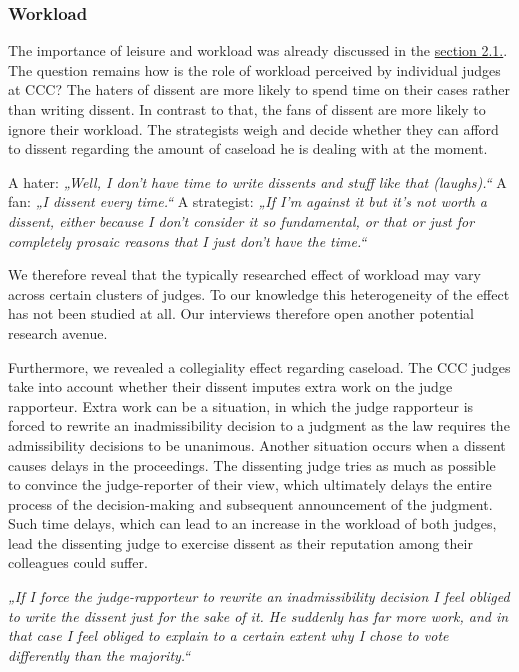 \documentclass[
  11pt,
]{article}
\begin{document}
\subsubsection{Workload}\label{workload}

The importance of leisure and workload was already discussed in the \hyperref[theory-dissent]{section 2.1.}. The question remains how is the role of workload perceived by individual judges at CCC? The haters of dissent are more likely to spend time on their cases rather than writing dissent. In contrast to that, the fans of dissent are more likely to ignore their workload. The strategists weigh and decide whether they can afford to dissent regarding the amount of caseload he is dealing with at the moment.

A hater: \emph{„Well, I don't have time to write dissents and stuff like that (laughs).``}
A fan: \emph{„I dissent every time.``}
A strategist: \emph{„If I'm against it but it's not worth a dissent, either because I don't consider it so fundamental, or that or just for completely prosaic reasons that I just don't have the time.``}

We therefore reveal that the typically researched effect of workload may vary across certain clusters of judges. To our knowledge this heterogeneity of the effect has not been studied at all. Our interviews therefore open another potential research avenue.

Furthermore, we revealed a collegiality effect regarding caseload. The CCC judges take into account whether their dissent imputes extra work on the judge rapporteur. Extra work can be a situation, in which the judge rapporteur is forced to rewrite an inadmissibility decision to a judgment as the law requires the admissibility decisions to be unanimous. Another situation occurs when a dissent causes delays in the proceedings. The dissenting judge tries as much as possible to convince the judge-reporter of their view, which ultimately delays the entire process of the decision-making and subsequent announcement of the judgment. Such time delays, which can lead to an increase in the workload of both judges, lead the dissenting judge to exercise dissent as their reputation among their colleagues could suffer.

\emph{„If I force the judge-rapporteur to rewrite an inadmissibility decision I feel obliged to write the dissent just for the sake of it. He suddenly has far more work, and in that case I feel obliged to explain to a certain extent why I chose to vote differently than the majority.``}
\end{document}
